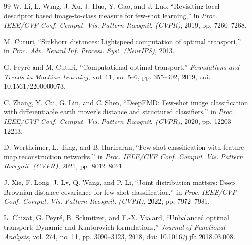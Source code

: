\documentclass[journal]{IEEEtran}
\newcommand{\1}{\mathbf{1}}
\begin{document}
\begin{thebibliography}{99}
W. Li, L. Wang, J. Xu, J. Huo, Y. Gao, and J. Luo,
``Revisiting local descriptor based image-to-class measure for few-shot learning,''
in \emph{Proc. IEEE/CVF Conf. Comput. Vis. Pattern Recognit. (CVPR)}, 2019, pp. 7260--7268.

M. Cuturi,
``Sinkhorn distances: Lightspeed computation of optimal transport,''
in \emph{Proc. Adv. Neural Inf. Process. Syst. (NeurIPS)}, 2013.

G. Peyr\'e and M. Cuturi,
``Computational optimal transport,''
\emph{Foundations and Trends in Machine Learning},
vol. 11, no. 5--6, pp. 355--602, 2019,
doi: 10.1561/2200000073.

C. Zhang, Y. Cai, G. Lin, and C. Shen,
``DeepEMD: Few-shot image classification with differentiable earth mover's distance and structured classifiers,''
in \emph{Proc. IEEE/CVF Conf. Comput. Vis. Pattern Recognit. (CVPR)}, 2020, pp. 12203--12213.

D. Wertheimer, L. Tang, and B. Hariharan,
``Few-shot classification with feature map reconstruction networks,''
in \emph{Proc. IEEE/CVF Conf. Comput. Vis. Pattern Recognit. (CVPR)}, 2021, pp. 8012--8021.

J. Xie, F. Long, J. Lv, Q. Wang, and P. Li,
``Joint distribution matters: Deep Brownian distance covariance for few-shot classification,''
in \emph{Proc. IEEE/CVF Conf. Comput. Vis. Pattern Recognit. (CVPR)}, 2022, pp. 7972--7981.

L. Chizat, G. Peyr\'e, B. Schmitzer, and F.-X. Vialard,
``Unbalanced optimal transport: Dynamic and Kantorovich formulations,''
\emph{Journal of Functional Analysis},
vol. 274, no. 11, pp. 3090--3123, 2018,
doi: 10.1016/j.jfa.2018.03.008.

\end{thebibliography}
\end{document}
